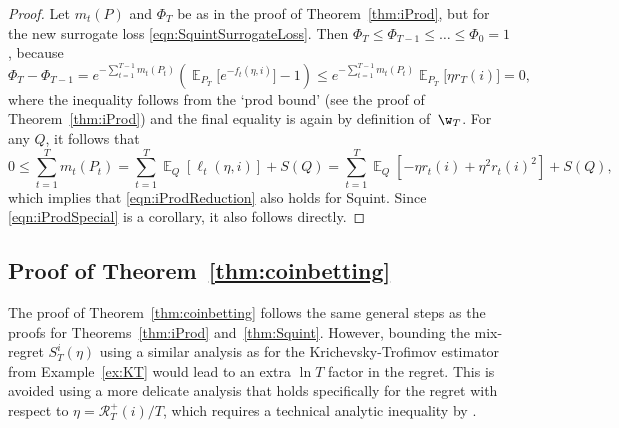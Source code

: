 \documentclass{colt2018} %
\DeclareMathOperator*{\E}{\mathbb{E}}
\newcommand{\sloss}{\ell}                       %
\newcommand{\sregret}{S}                        %
\newcommand{\regret}{\mathcal{R}}
\begin{document}
\begin{proof}
Let $m_t(P)$ and $\Phi_T$ be as in the proof of Theorem~\ref{thm:iProd},
but for the new surrogate loss \eqref{eqn:SquintSurrogateLoss}. Then
$\Phi_T \leq \Phi_{T-1} \leq \ldots \leq \Phi_0 = 1$, because
% 
\[
  \Phi_T - \Phi_{T-1}
    = e^{-\sum_{t=1}^{T-1} m_t(P_t)}
    \left(\E_{P_T}\big[e^{-f_t(\eta,i)}\big]-1\right)
    \leq e^{-\sum_{t=1}^{T-1} m_t(P_t)} \E_{P_T}\big[\eta r_T(i)\big] 
    = 0,
\]
% 
where the inequality follows from the `prod bound' (see the proof of
Theorem~\ref{thm:iProd}) and the final equality is again by definition
of~$\w_T$. For any $Q$, it follows that
% 
\[
  0 \leq \sum_{t=1}^T m_t(P_t) = \sum_{t=1}^T \E_{Q}[\sloss_t(\eta,i)]
  + \sregret(Q) = \sum_{t=1}^T \E_{Q}[-\eta r_t(i) + \eta^2 r_t(i)^2]
  + \sregret(Q),
\]
% 
which implies that \eqref{eqn:iProdReduction} also holds for Squint.
Since \eqref{eqn:iProdSpecial} is a corollary, it also follows directly.
\end{proof}

\subsection{Proof of Theorem~\ref{thm:coinbetting}}
\label{sec:coinbettingproof}

The proof of Theorem~\ref{thm:coinbetting} follows the same general
steps as the proofs for Theorems~\ref{thm:iProd} and~\ref{thm:Squint}.
However, bounding the mix-regret $\sregret_T^i(\eta)$ using a similar
analysis as for the Krichevsky-Trofimov estimator from
Example~\ref{ex:KT} would lead to an extra $\ln T$ factor in the
regret. This is avoided using a more delicate analysis that holds
specifically for the regret with respect to $\eta = \regret_T^+(i)/T$,
which requires a technical analytic inequality by
\citet[Lemma~16]{OrabonaPal2016}.
\end{document}
